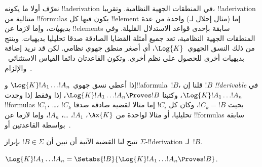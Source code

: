 \documentclass[../../../include/open-logic-section]{subfiles}
\begin{document}


نعرّف أولا ما يكونه !!a{derivation} في المنطقات الجهية النظامية.
وتقريبا، !!a{derivation} متتالية من !!{formula}s يكون فيها كل
!!{element} إما (مثال إحلال لـ) واحدة من عدة \emph{بديهيات}، وإما
لازما عن !!{element}s سابقة بإحدى قواعد الاستدلال القليلة. وفي
المنطقات الجهية النظامية، تعد جميع أمثلة القضايا الصادقة صدقا تحليليا
 بديهيات. وينتج من
ذلك النسق الجهوي~$\Log{K}$، أي أصغر منطق جهوي نظامي. لكن قد نريد إضافة
بديهيات أخرى للحصول على نظم أخرى. وتكون القاعدتان دائما القياس
الاستثنائي~\MP{} والإلزام~\Nec.

\begin{defn}
  إذا أعطي نسق جهوي $\Log{K} !A_1 \dots !A_n$ و!!a{formula}~$!B$،
  قلنا إن $!B$ \emph{!!{derivable}} في $\Log{K} !A_1 \dots
  !A_n$، وكتبنا $\Log{K} !A_1 \dots !A_n \Proves !B$، إذا وفقط إذا
  وجدت !!{formula}s $!C_1$، \dots، $!C_k$ بحيث $!C_k = !B$، وكان كل
  $!C_i$ إما مثالا لقضية صادقة صدقا تحليليا، أو مثالا لواحدة من
  $\Ax{K}$، $!A_1$، \dots، $!A_n$،
  وإما لازما عن !!{formula}s سابقة بواسطة القاعدتين \MP{} أو~\Nec.
\end{defn}

تتيح لنا القضية الآتية أن نبين أن $!B \in \Sigma$ بإبراز
$\Sigma$-!!{derivation} لـ~$!B$.

\begin{prop}
  $\Log{K} !A_1 \dots !A_n = \Setabs{!B}{\Log{K} !A_1 \dots !A_n \Proves !B}$.
\end{prop}
\end{document}
